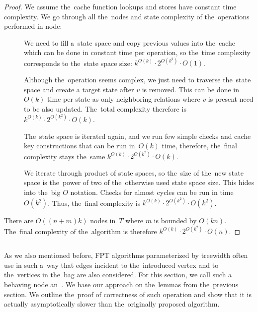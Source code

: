 \begin{proof}
	We assume the~cache function lookups and stores have constant time complexity.
	We go through all the~nodes and state complexity of the~operations performed in node:
	\begin{description}
		\item[\IntroduceVertexNode{}]
		      We need to fill a~state space and copy previous values into the~cache
		      which can be done in constant time per operation,
		      so the~time complexity corresponds to the~state space size:
		      \( {k}^{O(k)} \cdot 2^{O(k^2)} \cdot O(1) \).
		\item[\ForgetVertexNode{}]
		      Although the~operation seems complex, we just need to traverse the~state space
		      and create a target state after \( v \) is removed.
		      This can be done in~\( O(k) \) time
		      per state as only neighboring relations where \( v \) is present
		      need to be also updated.
		      The~total complexity therefore is
		      \( {k}^{O(k)} \cdot 2^{O(k^2)} \cdot O(k) \).
		\item[\IntroduceEdgeNode{}]
		      The~state space is iterated again, and we run few simple checks and cache key constructions
		      that can be run in~\( O(k) \) time, therefore, the~final complexity stays the~same
		      \( {k}^{O(k)} \cdot 2^{O(k^2)} \cdot O(k) \).
		\item[\JoinNode{}]
		      We iterate through product of state spaces,
		      so the~size of the~new state space is the~power of two
		      of the~otherwise used state space size.
		      This hides into the~big \( O \) notation.
		      Checks for almost cycles can be run in time \( O(k^2) \).
		      Thus, the~final complexity is
		      \( {k}^{O(k)} \cdot 2^{O(k^2)} \cdot O(k^2) \).
	\end{description}
	There are \( O((n+m)k) \) nodes in~\( T \) where \( m \) is bounded by \( O(kn) \).
	The~final complexity of the~algorithm is therefore
	\( {k}^{O(k)} \cdot 2^{O(k^2)} \cdot O(n) \).
\end{proof}
%

\subsection{\IntroduceVertexWithEdgesNode{}}

As we also mentioned before, FPT algorithms parameterized by treewidth
often use \IntroduceVertexNode{} in such a~way
that edges incident to the~introduced vertex and to
the~vertices in the~bag are also considered.
For this section, we call such a behaving node an~\IntroduceVertexWithEdgesNode{}.
%
We base our approach on the~lemmas from the~previous section.
We outline the~proof of correctness of such operation and show
that it is actually asymptotically slower than the~originally proposed algorithm.

